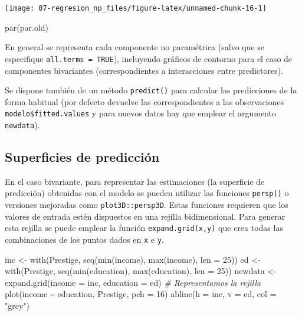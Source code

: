 \documentclass[
  spanish,
]{book}
\newenvironment{Shaded}{\begin{snugshade}}{\end{snugshade}}
\newcommand{\AttributeTok}[1]{\textcolor[rgb]{0.77,0.63,0.00}{#1}}
\newcommand{\CommentTok}[1]{\textcolor[rgb]{0.56,0.35,0.01}{\textit{#1}}}
\newcommand{\DecValTok}[1]{\textcolor[rgb]{0.00,0.00,0.81}{#1}}
\newcommand{\FunctionTok}[1]{\textcolor[rgb]{0.00,0.00,0.00}{#1}}
\newcommand{\NormalTok}[1]{#1}
\newcommand{\OtherTok}[1]{\textcolor[rgb]{0.56,0.35,0.01}{#1}}
\newcommand{\SpecialCharTok}[1]{\textcolor[rgb]{0.00,0.00,0.00}{#1}}
\newcommand{\StringTok}[1]{\textcolor[rgb]{0.31,0.60,0.02}{#1}}
\theoremstyle{break}
\theoremstyle{definition}
\theoremstyle{definition}
\theoremstyle{definition}
\theoremstyle{definition}
\theoremstyle{remark}
\begin{document}
\begin{center}\texttt{[image: 07-regresion\_np\_files/figure-latex/unnamed-chunk-16-1]} \end{center}

\begin{Shaded}
\begin{Highlighting}[]
\FunctionTok{par}\NormalTok{(par.old)}
\end{Highlighting}
\end{Shaded}

En general se representa cada componente no paramétrica (salvo que se especifique \texttt{all.terms\ =\ TRUE}), incluyendo gráficos de contorno para el caso de componentes bivariantes (correspondientes a interacciones entre predictores).

Se dispone también de un método \texttt{predict()} para calcular las predicciones de la forma habitual (por defecto devuelve las correspondientes a las observaciones \texttt{modelo\$fitted.values} y para nuevos datos hay que emplear el argumento \texttt{newdata}).

\hypertarget{superficies-de-predicciuxf3n}{%
\subsection{Superficies de predicción}\label{superficies-de-predicciuxf3n}}

En el caso bivariante, para representar las estimaciones (la superficie de predicción) obtenidas con el modelo se pueden utilizar las funciones \texttt{persp()} o versiones mejoradas como \texttt{plot3D::persp3D}.
Estas funciones requieren que los valores de entrada estén dispuestos en una rejilla bidimensional.
Para generar esta rejilla se puede emplear la función \texttt{expand.grid(x,y)} que crea todas las combinaciones de los puntos dados en \texttt{x} e \texttt{y}.

\begin{Shaded}
\begin{Highlighting}[]
\NormalTok{inc }\OtherTok{\textless{}{-}} \FunctionTok{with}\NormalTok{(Prestige, }\FunctionTok{seq}\NormalTok{(}\FunctionTok{min}\NormalTok{(income), }\FunctionTok{max}\NormalTok{(income), }\AttributeTok{len =} \DecValTok{25}\NormalTok{))}
\NormalTok{ed }\OtherTok{\textless{}{-}} \FunctionTok{with}\NormalTok{(Prestige, }\FunctionTok{seq}\NormalTok{(}\FunctionTok{min}\NormalTok{(education), }\FunctionTok{max}\NormalTok{(education), }\AttributeTok{len =} \DecValTok{25}\NormalTok{))}
\NormalTok{newdata }\OtherTok{\textless{}{-}} \FunctionTok{expand.grid}\NormalTok{(}\AttributeTok{income =}\NormalTok{ inc, }\AttributeTok{education =}\NormalTok{ ed)}
\CommentTok{\# Representamos la rejilla}
\FunctionTok{plot}\NormalTok{(income }\SpecialCharTok{\textasciitilde{}}\NormalTok{ education, Prestige, }\AttributeTok{pch =} \DecValTok{16}\NormalTok{)}
\FunctionTok{abline}\NormalTok{(}\AttributeTok{h =}\NormalTok{ inc, }\AttributeTok{v =}\NormalTok{ ed, }\AttributeTok{col =} \StringTok{"grey"}\NormalTok{)}
\end{Highlighting}
\end{Shaded}
\end{document}
